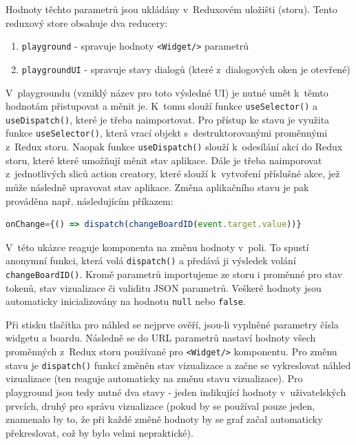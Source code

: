 \documentclass[czech, bc, kiv, he, iso690numb]{fasthesis}
\begin{document}
Hodnoty těchto parametrů jsou ukládány v~Reduxovém uložišti (storu). Tento reduxový store obsahuje dva reducery: 

\begin{enumerate}
	\item \texttt{playground} - spravuje hodnoty \texttt{<Widget/>} parametrů 
	\item \texttt{playgroundUI} - spravuje stavy dialogů (které z~dialogových oken je otevřené)
\end{enumerate}

V~playgroundu (vzniklý název pro toto výsledné UI) je nutné umět k~těmto hodnotám přistupovat a měnit je. K~tomu slouží funkce \texttt{useSelector()} a \texttt{useDispatch()},
které je třeba naimportovat. Pro přístup ke stavu je využita funkce \texttt{useSelector()}, která vrací objekt s~destruktorovanými proměnnými z~Redux storu. Naopak funkce 
\texttt{useDispatch()} slouží k~odesílání akcí do Redux storu, které které umožňují měnit stav aplikace. Dále je třeba naimporovat z~jednotlivých sliců action creatory, které
slouží k~vytvoření příslušné akce, jež může následně upravovat stav aplikace. Změna aplikačního stavu je pak prováděna např. následujícím příkazem:

\begin{lstlisting}[language=Javascript]
onChange={() => dispatch(changeBoardID(event.target.value))}
\end{lstlisting}

V~této ukázce reaguje komponenta na změnu hodnoty v~poli. To spustí anonymní funkci, která volá \texttt{dispatch()} a předává ji výsledek volání \texttt{changeBoardID()}. Kromě parametrů
importujeme ze storu i proměnné pro stav tokenů, stav vizualizace či validitu JSON parametrů. Veškeré hodnoty jsou automaticky inicializovány na hodnotu \texttt{null} nebo \texttt{false}.

Při stisku tlačítka pro náhled se nejprve ověří, jsou-li vyplněné parametry čísla widgetu a boardu. Následně se do URL parametrů nastaví hodnoty všech proměnných z~Redux storu
používané pro \texttt{<Widget/>} komponentu. Pro změnu stavu je \texttt{dispatch()} funkcí změněn stav vizualizace a začne se vykreslovat náhled vizualizace (ten reaguje automaticky
na změnu stavu vizualizace). Pro playground jsou tedy nutné dva stavy - jeden indikující hodnoty v~uživatelských prvcích, druhý pro správu vizualizace (pokud by se používal pouze jeden,
znamenalo by to, že při každé změně hodnoty by se graf začal automaticky překreslovat, což by bylo velmi nepraktické).
\end{document}
